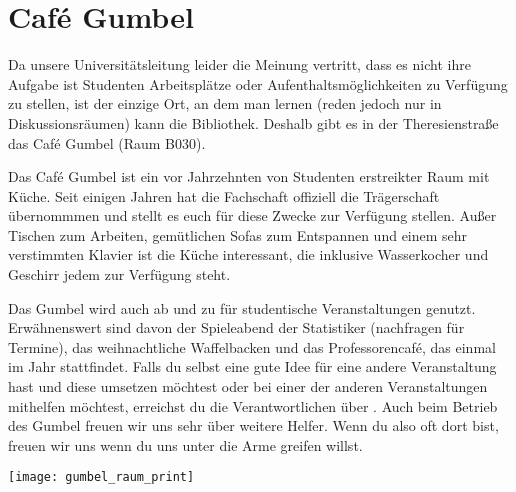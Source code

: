 ﻿
\chapter{Café Gumbel}

Da unsere Universitätsleitung leider die Meinung vertritt, dass es nicht ihre
Aufgabe ist Studenten  Arbeitsplätze oder Aufenthaltsmöglichkeiten zu Verfügung
zu stellen, ist der einzige Ort, an dem man lernen (reden jedoch nur in
Diskussionsräumen) kann die Bibliothek. Deshalb gibt es in der Theresienstraße
das Café Gumbel (Raum B030).

Das Café Gumbel ist ein vor Jahrzehnten von Studenten erstreikter Raum mit
Küche. Seit einigen Jahren hat die Fachschaft offiziell die Trägerschaft
übernommmen und stellt es euch für diese Zwecke zur Verfügung stellen.  Außer
Tischen zum Arbeiten, gemütlichen Sofas zum Entspannen und einem sehr
verstimmten Klavier ist die Küche interessant, die inklusive Wasserkocher und
Geschirr jedem zur Verfügung steht.

Das Gumbel wird auch ab und zu für studentische Veranstaltungen genutzt.
Erwähnenswert sind davon der Spieleabend der Statistiker (nachfragen für
Termine), das weihnachtliche Waffelbacken und das Professorencafé, das einmal
im Jahr stattfindet.  Falls du selbst eine gute Idee für eine andere
Veranstaltung hast und diese umsetzen möchtest oder bei einer der anderen
Veranstaltungen mithelfen möchtest, erreichst du die Verantwortlichen über
. Auch beim Betrieb des Gumbel freuen wir uns sehr über
weitere Helfer. Wenn du also oft dort bist, freuen wir uns wenn du uns unter
die Arme greifen willst.

\skiptobottom
\texttt{[image: gumbel\_raum\_print]}
